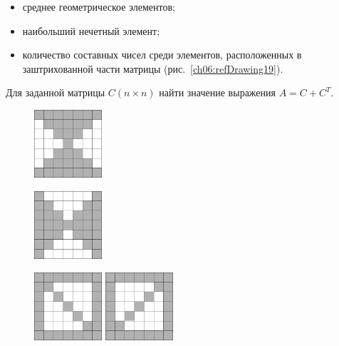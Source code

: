 \begin{enumerate}
\begin{itemize}
\item среднее геометрическое элементов;
\item наибольший нечетный элемент;
\item количество составных чисел среди элементов, расположенных в заштрихованной 
части матрицы (рис.~\ref{ch06:refDrawing19}).
\end{itemize}
Для заданной матрицы $C(n\times n)$ найти значение выражения  $A=C+C^T$.

\begin{figure}%
\begin{floatrow}[4]
\ffigbox[\FBwidth]
{%
\captionsetup{labelfont=footnotesize}\caption{}%
\label{ch06:refDrawing19}}
{\includegraphics[width=0.225\textwidth,keepaspectratio]{img/ris_6_20}}%

\ffigbox[\FBwidth]
{\caption{}%
\label{ch06:refDrawing20}}
{\includegraphics[width=0.225\textwidth,keepaspectratio]{img/ris_6_21}}%

\ffigbox[\FBwidth]%
{\caption{}%
\label{ch06:refDrawing21}}
{\includegraphics[width=0.225\textwidth,keepaspectratio]{img/ris_6_22}}%
\ffigbox[\FBwidth]%
{\caption{}%
\label{ch06:refDrawing22}}
{\includegraphics[width=0.225\textwidth,keepaspectratio]{img/ris_6_23}}%
\end{floatrow}
\end{figure}%




\end{enumerate}
